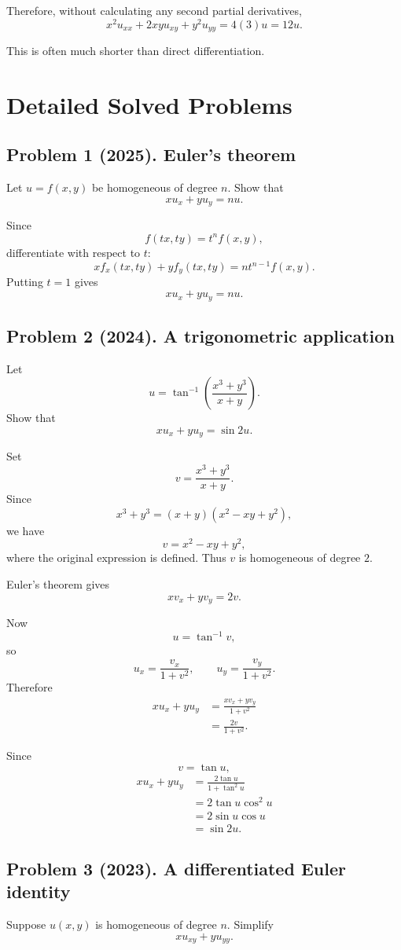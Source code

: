 \documentclass[11pt,oneside]{book}
\theoremstyle{studentthm}
\theoremstyle{definition}
\begin{document}
Therefore, without calculating any second partial derivatives,
\[
x^2u_{xx}
+
2xyu_{xy}
+
y^2u_{yy}
=
4(3)u
=
12u.
\]

This is often much shorter than direct differentiation.


\section{Detailed Solved Problems}

\subsection*{Problem 1 (2025). Euler's theorem}
Let \(u=f(x,y)\) be homogeneous of degree \(n\). Show that
\[
xu_x+yu_y=nu.
\]

Since
\[
f(tx,ty)=t^n f(x,y),
\]
differentiate with respect to \(t\):
\[
x f_x(tx,ty)+y f_y(tx,ty)
=
nt^{n-1}f(x,y).
\]
Putting \(t=1\) gives
\[
xu_x+yu_y=nu.
\]

\subsection*{Problem 2 (2024). A trigonometric application}
Let
\[
u
=
\tan^{-1}
\left(
\frac{x^3+y^3}{x+y}
\right).
\]
Show that
\[
xu_x+yu_y=\sin2u.
\]

Set
\[
v=\frac{x^3+y^3}{x+y}.
\]
Since
\[
x^3+y^3=(x+y)(x^2-xy+y^2),
\]
we have
\[
v=x^2-xy+y^2,
\]
where the original expression is defined. Thus \(v\) is homogeneous
of degree \(2\).

Euler's theorem gives
\[
xv_x+yv_y=2v.
\]

Now
\[
u=\tan^{-1}v,
\]
so
\[
u_x=\frac{v_x}{1+v^2},
\qquad
u_y=\frac{v_y}{1+v^2}.
\]
Therefore
\[
\begin{aligned}
xu_x+yu_y
&=
\frac{xv_x+yv_y}{1+v^2}\\
&=
\frac{2v}{1+v^2}.
\end{aligned}
\]

Since
\[
v=\tan u,
\]
\[
\begin{aligned}
xu_x+yu_y
&=
\frac{2\tan u}{1+\tan^2u}\\
&=
2\tan u\cos^2u\\
&=
2\sin u\cos u\\
&=
\sin2u.
\end{aligned}
\]

\subsection*{Problem 3 (2023). A differentiated Euler identity}
Suppose \(u(x,y)\) is homogeneous of degree \(n\). Simplify
\[
xu_{xy}+yu_{yy}.
\]
\end{document}
